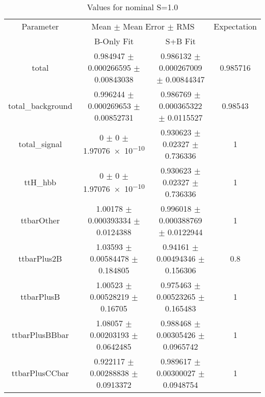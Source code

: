 \begin{table}
\centering
\caption{Values for nominal S=1.0}
\begin{tabular}{cccc}
\toprule
Parameter & \multicolumn{2}{c}{Mean $\pm$ Mean Error $\pm$ RMS} & Expectation\\
 & B-Only Fit & S+B Fit & \\
\midrule
total & \num{0.984947} $\pm$ \num{0.000266595} $\pm$ \num{0.00843038} & \num{0.986132} $\pm$ \num{0.000267009} $\pm$ \num{0.00844347} & \num{0.985716}\\
total\_background & \num{0.996244} $\pm$ \num{0.000269653} $\pm$ \num{0.00852731} & \num{0.986769} $\pm$ \num{0.000365322} $\pm$ \num{0.0115527} & \num{0.98543}\\
total\_signal & \num{0} $\pm$ \num{0} $\pm$ \num{1.97076e-10} & \num{0.930623} $\pm$ \num{0.02327} $\pm$ \num{0.736336} & \num{1}\\
ttH\_hbb & \num{0} $\pm$ \num{0} $\pm$ \num{1.97076e-10} & \num{0.930623} $\pm$ \num{0.02327} $\pm$ \num{0.736336} & \num{1}\\
ttbarOther & \num{1.00178} $\pm$ \num{0.000393334} $\pm$ \num{0.0124388} & \num{0.996018} $\pm$ \num{0.000388769} $\pm$ \num{0.0122944} & \num{1}\\
ttbarPlus2B & \num{1.03593} $\pm$ \num{0.00584478} $\pm$ \num{0.184805} & \num{0.94161} $\pm$ \num{0.00494346} $\pm$ \num{0.156306} & \num{0.8}\\
ttbarPlusB & \num{1.00523} $\pm$ \num{0.00528219} $\pm$ \num{0.16705} & \num{0.975463} $\pm$ \num{0.00523265} $\pm$ \num{0.165483} & \num{1}\\
ttbarPlusBBbar & \num{1.08057} $\pm$ \num{0.00203193} $\pm$ \num{0.0642485} & \num{0.988468} $\pm$ \num{0.00305426} $\pm$ \num{0.0965742} & \num{1}\\
ttbarPlusCCbar & \num{0.922117} $\pm$ \num{0.00288838} $\pm$ \num{0.0913372} & \num{0.989617} $\pm$ \num{0.00300027} $\pm$ \num{0.0948754} & \num{1}\\
\bottomrule
\end{tabular}
\end{table}